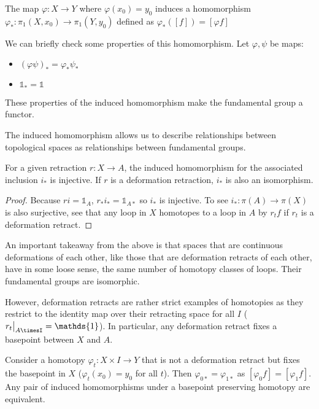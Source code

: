 \documentclass[10pt]{article}
\newcommand\restr[2]{{%
  \left.\kern-\nulldelimiterspace %
  #1 %
  \vphantom{\big|} %
  \right|_{#2} %
}}
\begin{document}
\begin{definition}
	The map $\varphi: X \to Y$ where $\varphi(x_0) = y_0$ induces a homomorphism $\varphi_*: \pi_1(X, x_0) \to \pi_1(Y, y_0)$ defined as $\varphi_*([f]) = [\varphi f]$
\end{definition}

We can briefly check some properties of this homomorphism. Let $\varphi, \psi$ be maps:
\begin{itemize}
	\item{$(\varphi\psi)_* = \varphi_*\psi_*$}
	\item{$\mathds{1}_* = \mathds{1}$}
\end{itemize}
These properties of the induced homomorphism make the fundamental group a functor.

The induced homomorphism allows us to describe relationships between topological spaces as relationships between fundamental groups.

\begin{proposition}[]
	For a given retraction $r: X \to A$, the induced homomorphism for the associated inclusion $i_*$ is injective. If $r$ is a deformation retraction, $i_*$ is also an isomorphism.
\end{proposition}

\begin{proof}
	Because $ri = \mathds{1}_A$, $r_*i_* = \mathds{1}_{A*}$ so $i_*$ is injective. To see $i_*: \pi(A) \to \pi(X)$ is also surjective, see that any loop in $X$ homotopes to a loop in $A$ by $r_tf$ if $r_t$ is a deformation retract.
\end{proof}

	An important takeaway from the above is that spaces that are continuous deformations of each other, like those that are deformation retracts of each other, have in some loose sense, the same number of homotopy classes of loops. Their fundamental groups are isomorphic.

	However, deformation retracts are rather strict examples of homotopies as they restrict to the identity map over their retracting space for all $I$ ($\restr{r_t}{A\timesI} = \mathds{1}$). In particular, any deformation retract fixes a basepoint between $X$ and $A$.

	Consider a homotopy $\varphi_t: X \times I \to Y$ that is not a deformation retract but fixes the basepoint in $X$ ($\varphi_t(x_0) = y_0$ for all $t$). Then $\varphi_{0*} = \varphi_{1*}$ as $[\varphi_0f] = [\varphi_1f]$. Any pair of induced homomorphisms under a basepoint preserving homotopy are equivalent.
\end{document}
